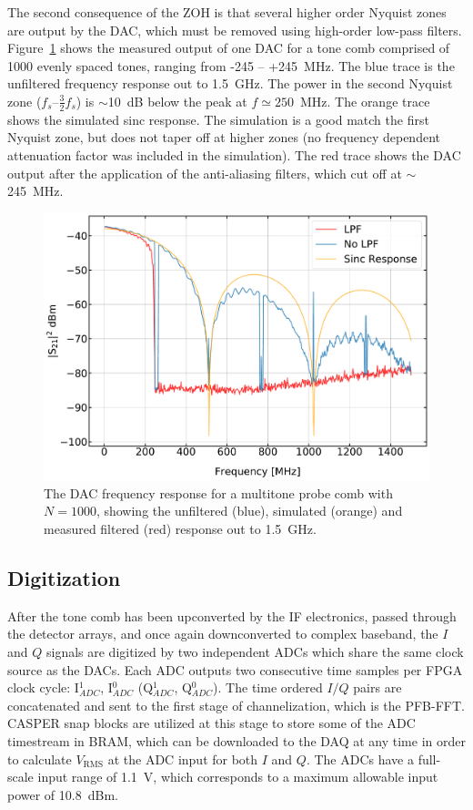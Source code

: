The second consequence of the ZOH is that several higher order Nyquist zones are output by the DAC, which must be removed using high-order low-pass filters. Figure~\ref{fig:dac sim} shows the measured output of one DAC for a tone comb comprised of 1000 evenly spaced tones, ranging from -245 -- +245~MHz. The blue trace is the unfiltered frequency response out to 1.5~GHz. The power in the second Nyquist zone ($f_{s}$--$\frac{3}{2}f_{s}$) is $\sim$10~dB below the peak at $f \simeq 250$~MHz. The orange trace shows the simulated sinc response. The simulation is a good match the first Nyquist zone, but does not taper off at higher zones (no frequency dependent attenuation factor was included in the simulation). The red trace shows the DAC output after the application of the anti-aliasing filters, which cut off at $\sim$245~MHz.

\begin{figure}[!htbp]
\centering
\includegraphics[width=\textwidth]{figures/readout/sim/dac_comp}
\caption[~The DAC frequency response (measured and simulated), with and without anti-aliasing filters.]{The DAC frequency response for a multitone probe comb with $N = 1000$, showing the unfiltered (blue), simulated (orange) and measured filtered (red) response out to 1.5~GHz.}
\label{fig:dac sim}
\end{figure}

\subsection{Digitization}\label{digitization}

After the tone comb has been upconverted by the IF electronics, passed through the detector arrays, and once again downconverted to complex baseband, the $I$ and $Q$ signals are digitized by two independent ADCs which share the same clock source as the DACs. Each ADC outputs two consecutive time samples per FPGA clock cycle: I$_{ADC}^{1}$, I$_{ADC}^{0}$ (Q$_{ADC}^{1}$, Q$_{ADC}^{0}$). The time ordered $I/Q$ pairs are concatenated and sent to the first stage of channelization, which is the PFB-FFT. CASPER snap blocks are utilized at this stage to store some of the ADC timestream in BRAM, which can be downloaded to the DAQ at any time in order to calculate $V_{\mathrm{RMS}}$ at the ADC input for both $I$ and $Q$. The ADCs have a full-scale input range of 1.1~V, which corresponds to a maximum allowable input power of 10.8~dBm.

